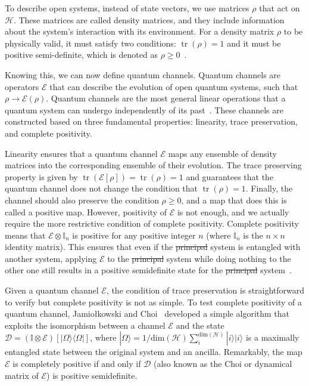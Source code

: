 \documentclass[10pt,letterpaper]{article} %
\DeclareMathOperator{\tr}{tr}
\providecommand{\DIFaddtex}[1]{{\protect\color{blue}\uwave{#1}}} %
\providecommand{\DIFdeltex}[1]{{\protect\color{red}\sout{#1}}}                      %
\providecommand{\DIFaddbegin}{} %
\providecommand{\DIFaddend}{} %
\providecommand{\DIFdelbegin}{} %
\providecommand{\DIFdelend}{} %
\providecommand{\DIFadd}[1]{\texorpdfstring{\DIFaddtex{#1}}{#1}} %
\providecommand{\DIFdel}[1]{\texorpdfstring{\DIFdeltex{#1}}{}} %
\newcommand{\DIFscaledelfig}{0.5}
\newlength{\DIFdelgraphicswidth} %
\newlength{\DIFdelgraphicsheight} %
\newcommand{\DIFaddincludegraphics}[2][]{{\color{blue}\fbox{\DIFOincludegraphics[#1]{#2}}}} %
\newcommand{\DIFdelincludegraphics}[2][]{%
\sbox{\DIFdelgraphicsbox}{\DIFOincludegraphics[#1]{#2}}%
\settoboxwidth{\DIFdelgraphicswidth}{\DIFdelgraphicsbox} %
\settoboxtotalheight{\DIFdelgraphicsheight}{\DIFdelgraphicsbox} %
\scalebox{\DIFscaledelfig}{%
\parbox[b]{\DIFdelgraphicswidth}{\usebox{\DIFdelgraphicsbox}\\[-\baselineskip] \rule{\DIFdelgraphicswidth}{0em}}\llap{\resizebox{\DIFdelgraphicswidth}{\DIFdelgraphicsheight}{%
\setlength{\unitlength}{\DIFdelgraphicswidth}%
\begin{picture}(1,1)%
\thicklines\linethickness{2pt} %
{\color[rgb]{1,0,0}\put(0,0){\framebox(1,1){}}}%
{\color[rgb]{1,0,0}\put(0,0){\line( 1,1){1}}}%
{\color[rgb]{1,0,0}\put(0,1){\line(1,-1){1}}}%
\end{picture}%
}\hspace*{3pt}}} %
} %
\DeclareRobustCommand{\DIFaddbegin}{\DIFOaddbegin \let\includegraphics\DIFaddincludegraphics} %
\DeclareRobustCommand{\DIFaddend}{\DIFOaddend \let\includegraphics\DIFOincludegraphics} %
\DeclareRobustCommand{\DIFdelbegin}{\DIFOdelbegin \let\includegraphics\DIFdelincludegraphics} %
\DeclareRobustCommand{\DIFdelend}{\DIFOaddend \let\includegraphics\DIFOincludegraphics} %
\begin{document}
To describe open systems, instead of state vectors, we use matrices $\rho$ that
act on $\mathcal{H}$.  These matrices are called density matrices, and they
include information about the system's interaction with its environment.  For a
density matrix $\rho$ to be physically valid, it must satisfy two conditions:
$\tr(\rho) = 1$ and it must be positive semi-definite, which is denoted as
$\rho \geq 0$~\cite{chuangbook}.


Knowing this, we can now define quantum channels.  Quantum channels are
operators $\mathcal{E}$ that can describe the evolution of open quantum
systems, such that $\rho \rightarrow \mathcal{E}(\rho)$.  Quantum channels are
the most general linear operations that a quantum system can undergo
independently of its past~\cite{zimansbook,cirac}.  These channels are
constructed based on three fundamental properties: linearity, trace
preservation, and complete positivity.

Linearity ensures that a quantum channel $\mathcal{E}$ maps any ensemble of
density matrices into the corresponding ensemble of their evolution.  The trace
preserving property is given by $\tr (\mathcal{E}[\rho]) = \tr (\rho) = 1$ and
guarantees that the quantum channel does not change the condition that
$\tr(\rho) = 1$.  Finally, the channel should also preserve the condition $\rho
\geq 0$, and a map that does this is called a positive map.  However,
positivity of $\mathcal{E}$ is not enough, and we actually require the more
restrictive condition of complete positivity.  Complete positivity means that
$\mathcal{E} \otimes \mathbb{I}_n$ is positive for any positive integer $n$
(where $\mathbb{I}_n$ is the $n\times n$ identity matrix).  This ensures that
even if the \DIFdelbegin \DIFdel{principal }\DIFdelend \DIFaddbegin \DIFadd{main }\DIFaddend system is entangled with another system, applying
$\mathcal{E}$ to the \DIFdelbegin \DIFdel{principal }\DIFdelend \DIFaddbegin \DIFadd{main }\DIFaddend system while doing nothing to the other one
still results in  a positive semidefinite state for the \DIFdelbegin \DIFdel{principal
}\DIFdelend \DIFaddbegin \DIFadd{main
}\DIFaddend system~\cite{chuangbook}. 

Given a quantum channel $\mathcal{E}$, the condition of trace preservation is
straightforward to verify but complete positivity is not as simple.  To test
complete positivity of a quantum channel, Jamiołkowski and
Choi~\cite{choi,jamil} developed a simple algorithm that exploits the
isomorphism between a channel $\mathcal{E}$ and the state $\mathcal{D} =
(\mathbb{I} \otimes \mathcal{E}) [|\Omega \rangle \langle  \Omega|]$, where
$|\Omega\rangle = 1/\text{dim}(\mathcal{H}) \sum_{i}^{\text{dim}(\mathcal{H})}
|i \rangle |i \rangle$ is a maximally entangled state between the original
system and an ancilla.  Remarkably, the map $\mathcal{E}$ is completely
positive if and only if $\mathcal{D}$ (also known as the Choi or dynamical
matrix of $\mathcal{E}$) is positive semidefinite.
\end{document}
